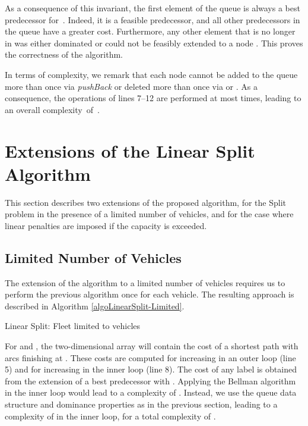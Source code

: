 \documentclass[11pt]{article}
\begin{document}
As a consequence of this invariant, the first element of the queue is always a best predecessor for~. Indeed, it is a feasible predecessor, and all other predecessors in the queue have a greater cost. Furthermore, any other element that is no longer in  was either dominated or could not be feasibly extended to a node . This proves the correctness of the algorithm.

In terms of complexity, we remark that each node  cannot be added to the queue more than once via \emph{pushBack} or deleted more than once via  or . As a consequence, the operations of lines 7--12 are performed at most  times, leading to an overall complexity~of~.

\section{Extensions of the Linear Split Algorithm}

This section describes two extensions of the proposed algorithm, for the Split problem in the presence of a limited number of vehicles, and for the case where linear penalties are imposed if the capacity is exceeded.

\subsection{Limited Number of Vehicles}
\label{sectionLinearLimited}

The extension of the algorithm to a limited number of vehicles requires us to perform the previous algorithm once for each vehicle. The resulting approach is described in Algorithm \ref{algoLinearSplit-Limited}.

\begin{algorithm}[htbp]

{
{
 \;
}
}

 \;
{ 
	 \;
	 \;
	{ 
  		 \;   \label{linearSplitPropagate-Limited}
  		 \;

 	 	\If{}
		{
			{
	  			{  \; }
				
			}
  			{  \; }
		}
	}
}
 \caption{Linear Split: Fleet limited to  vehicles} 
\label{algoLinearSplit-Limited} 
\end{algorithm}

For  and , the two-dimensional array  will contain the cost of a shortest path with  arcs finishing at . These costs are computed for increasing  in an outer loop (line 5) and for increasing  in the inner loop (line 8). The cost of any label  is obtained from the extension of a best predecessor  with . Applying the Bellman algorithm in the inner loop would lead to a complexity of . Instead, we use the queue data structure and dominance properties as in the previous section, leading to a complexity of  in the inner loop, for a total complexity of .
\end{document}

